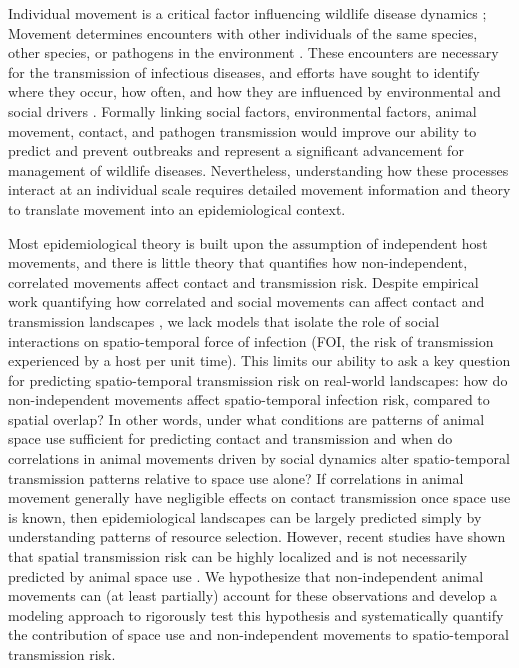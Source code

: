 \documentclass[letterpaper]{article}
\begin{document}
Individual movement is a critical factor influencing wildlife disease dynamics \citep{Dougherty2018,Manlove2022};
Movement determines encounters with other individuals of the same species, other species, or pathogens in the environment \citep{Martinez-Garcia2020,Das2023}. 
These encounters are necessary for the transmission of infectious diseases, and efforts have sought to identify where they occur, how often, and how they are influenced by environmental and social drivers \citep{Titcomb2021,Dougherty2022,Webber2023}. 
Formally linking social factors, environmental factors, animal movement, contact, and pathogen transmission would improve our ability to predict and prevent outbreaks and represent a significant advancement for management of wildlife diseases.  
Nevertheless, understanding how these processes interact at an individual scale requires detailed movement information and theory to translate movement into an epidemiological context.

Most epidemiological theory is built upon the assumption of independent host movements, and there is little theory that quantifies how non-independent, correlated movements affect contact and transmission risk. Despite empirical work quantifying how correlated and social movements can affect contact and transmission landscapes \citep[e.g.,][]{Kjaer2008,Grear2010,Schauber2015a}, we lack models that isolate the role of social interactions on spatio-temporal force of infection (FOI, the risk of transmission experienced by a host per unit time). This limits our ability to ask a key question for predicting spatio-temporal transmission risk on real-world landscapes: how do non-independent movements affect spatio-temporal infection risk, compared to spatial overlap?  In other words, under what conditions are patterns of animal space use sufficient for predicting contact and transmission and when do correlations in animal movements driven by social dynamics alter spatio-temporal transmission patterns relative to space use alone?  If correlations in animal movement generally have negligible effects on contact transmission once space use is known, then epidemiological landscapes can be largely predicted simply by understanding patterns of resource selection. However, recent studies have shown that spatial transmission risk can be highly localized \citep{Albery2021} and is not necessarily predicted by animal space use \citep{Yang2023a}. We hypothesize that non-independent animal movements can (at least partially) account for these observations and develop a modeling approach to rigorously test this hypothesis and systematically quantify the contribution of space use and non-independent movements to spatio-temporal transmission risk.
\end{document}
